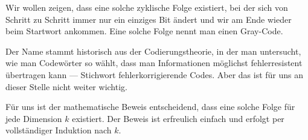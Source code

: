 \begin{spoken-clean}[00:43:45 - 00:46:50]
Wir wollen zeigen, dass eine solche zyklische Folge existiert, bei der sich von Schritt zu Schritt immer nur ein einziges Bit ändert und wir am Ende wieder beim Startwort ankommen. Eine solche Folge nennt man einen Gray-Code.

Der Name stammt historisch aus der Codierungstheorie, in der man untersucht, wie man Codewörter so wählt, dass man Informationen möglichst fehlerresistent übertragen kann --- Stichwort fehlerkorrigierende Codes. Aber das ist für uns an dieser Stelle nicht weiter wichtig.

Für uns ist der mathematische Beweis entscheidend, dass eine solche Folge für jede Dimension $k$ existiert. Der Beweis ist erfreulich einfach und erfolgt per vollständiger Induktion nach $k$.
\end{spoken-clean}

\begin{math-stroke}
\end{math-stroke}

